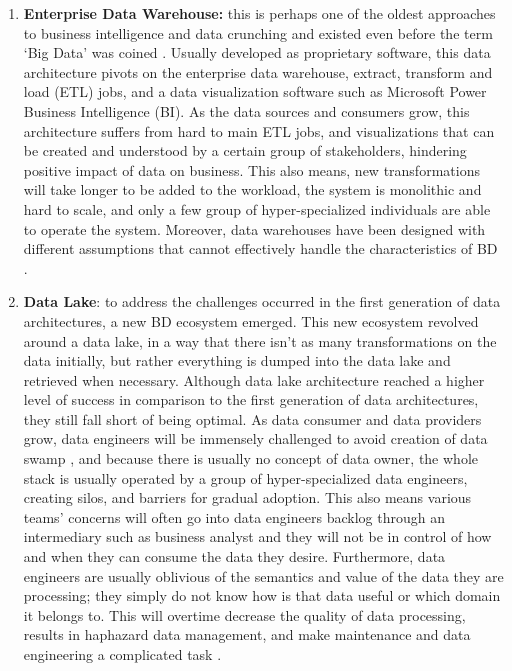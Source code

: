 \documentclass[review]{elsarticle}
\begin{document}
\begin{enumerate}
    \item \textbf{Enterprise Data Warehouse:} this is perhaps one of the oldest approaches to business intelligence and data crunching and existed even before the term `Big Data' was coined \cite{leonard2011design}. Usually developed as proprietary software, this data architecture pivots on the enterprise data warehouse, extract, transform and load (ETL) jobs, and a data visualization software such as Microsoft Power Business Intelligence (BI). As the data sources and consumers grow, this architecture suffers from hard to main ETL jobs, and visualizations that can be created and understood by a certain group of stakeholders, hindering positive impact of data on business. This also means, new transformations will take longer to be added to the workload, the system is monolithic and hard to scale, and only a few group of hyper-specialized individuals are able to operate the system. Moreover, data warehouses have been designed with different assumptions that cannot effectively handle the characteristics of BD \cite{ataei2022state}.
    \item \textbf{Data Lake}: to address the challenges occurred in the first generation of data architectures, a new BD ecosystem emerged. This new ecosystem revolved around a data lake, in a way that there isn't as many transformations on the data initially, but rather everything is dumped into the data lake and retrieved when necessary. Although data lake architecture reached a higher level of success in comparison to the first generation of data architectures, they still fall short of being optimal. As data consumer and data providers grow, data engineers will be immensely challenged to avoid creation of data swamp \cite{brackenbury2018draining}, and because there is usually no concept of data owner, the whole stack is usually operated by a group of hyper-specialized data engineers, creating silos, and barriers for gradual adoption. This also means various teams' concerns will often go into data engineers backlog through an intermediary such as business analyst and they will not be in control of how and when they can consume the data they desire. Furthermore, data engineers are usually oblivious of the semantics and value of the data they are processing; they simply do not know how is that data useful or which domain it belongs to. This will overtime decrease the quality of data processing, results in haphazard data management, and make maintenance and data engineering a complicated task \cite{ataei2023towards}. 

\end{enumerate}
\end{document}
